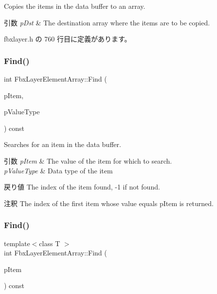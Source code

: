 Copies the items in the data buffer to an array. 
\begin{DoxyParams}{引数}
{\em p\+Dst} & The destination array where the items are to be copied. \\
\hline
\end{DoxyParams}


 fbxlayer.\+h の 760 行目に定義があります。

\mbox{\label{class_fbx_layer_element_array_ad5075288db8274e13b13f14ec8414dec}} 
\subsubsection{\texorpdfstring{Find()}{Find()}\hspace{0.1cm}{\footnotesize\ttfamily [1/2]}}
{\footnotesize\ttfamily int Fbx\+Layer\+Element\+Array\+::\+Find (\begin{DoxyParamCaption}\item[{const void $\ast$}]{p\+Item,  }\item[{\hyperlink{fbxpropertytypes_8h_a73913a5ddfb20e57c6f25e9e6784bd92}{E\+Fbx\+Type}}]{p\+Value\+Type }\end{DoxyParamCaption}) const}

Searches for an item in the data buffer. 
\begin{DoxyParams}{引数}
{\em p\+Item} & The value of the item for which to search. \\
\hline
{\em p\+Value\+Type} & Data type of the item \\
\hline
\end{DoxyParams}
\begin{DoxyReturn}{戻り値}
The index of the item found, -\/1 if not found. 
\end{DoxyReturn}
\begin{DoxyRemark}{注釈}
The index of the first item whose value equals p\+Item is returned. 
\end{DoxyRemark}
\mbox{\label{class_fbx_layer_element_array_a8dcc42ae3b8a351a1d5204a416fe72de}} 
\subsubsection{\texorpdfstring{Find()}{Find()}\hspace{0.1cm}{\footnotesize\ttfamily [2/2]}}
{\footnotesize\ttfamily template$<$class T $>$ \\
int Fbx\+Layer\+Element\+Array\+::\+Find (\begin{DoxyParamCaption}\item[{T const \&}]{p\+Item }\end{DoxyParamCaption}) const\hspace{0.3cm}{\ttfamily [inline]}}

